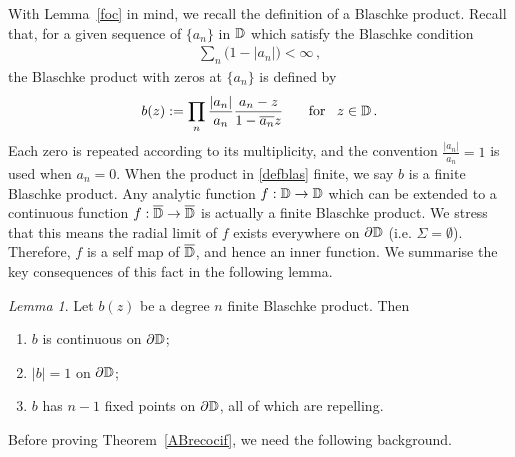 \documentclass[11pt,reqno]{amsart}
\newcommand{\D}{{\Bbb D}}
\newcommand{\0}{\mathbf{0}}
\newtheorem{lemma}{Lemma}
\theoremstyle{remark}
\numberwithin{equation}{section}
\newtheorem{lemma}[theorem]{Lemma}
\theoremstyle{remark}
\numberwithin{equation}{section}
\begin{document}
With Lemma~\ref{foc} in mind, we recall the definition of a Blaschke product.
Recall that, for a given sequence of $\{a_n\}$ in $\D$ which satisfy the Blaschke condition \begin{align*}
     \sum_{n} \big(1-|a_n|\big)<\infty \, , 
\end{align*}
the Blaschke product with zeros at $\{a_n\}$ is defined by
\begin{align}\label{defblas}
 b(z):= \prod\limits_{n} \frac{|a_n|}{a_n} \frac{a_n-z}{1-\overline{a_n}z} \,  \quad \text{ \ for \ } \,  z \in \D \, .
\end{align}
Each zero is repeated according to its multiplicity, and the convention $\frac{|a_n|}{a_n}=1$ is used when $a_n=0$.
When the product in \eqref{defblas} finite, we say $b$ is a finite Blaschke product. 
Any analytic function $f: \D \to \D$ which can be extended to a continuous function $f:\overline{\D} \to \overline{\D}$ is actually a finite Blaschke product. We stress that this means the radial limit of $f$ exists everywhere on $\partial \D$ (i.e. $\Sigma=\emptyset$). Therefore, $f$ is a self map of $\overline{\D}$, and hence an inner function. We summarise the key consequences of this fact in the following lemma.
\begin{lemma}\label{blasprop}
Let $b(z)$ be a degree $n$ finite Blaschke product. Then 
\begin{enumerate}
    \item {$b$ is continuous on $\partial \D$};
    \item {$|b|=1$ on $\partial \D$};
    \item {$b$ has $n-1$ fixed points on $\partial \D$, all of which are repelling}.
\end{enumerate}
\end{lemma}

Before proving Theorem~\ref{ABrecocif}, we need the following background.
\end{document}
